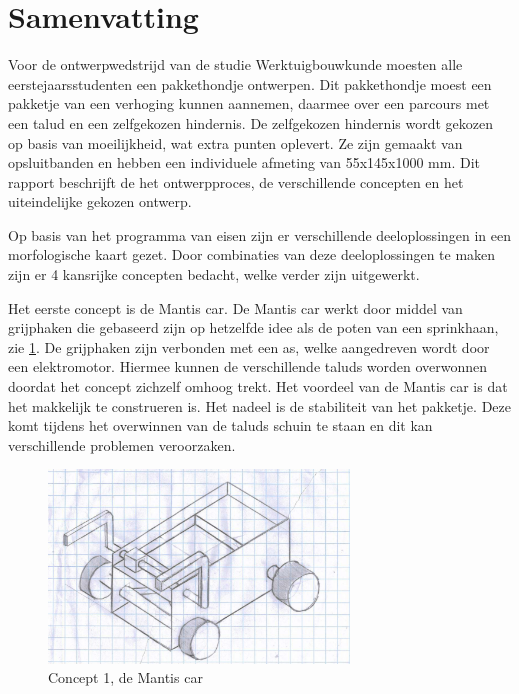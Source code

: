 \chapter*{Samenvatting}
\label{cha:Samenvatting}

Voor de ontwerpwedstrijd van de studie Werktuigbouwkunde moesten alle eerstejaarsstudenten een pakkethondje ontwerpen. Dit pakkethondje moest een pakketje van een verhoging kunnen aannemen, daarmee over een parcours met een talud en een zelfgekozen hindernis. De zelfgekozen hindernis wordt gekozen op basis van moeilijkheid, wat extra punten oplevert. Ze zijn gemaakt van opsluitbanden en hebben een individuele afmeting van 55x145x1000 mm. Dit rapport beschrijft de het ontwerpproces, de verschillende concepten en het uiteindelijke gekozen ontwerp.

Op basis van het programma van eisen zijn er verschillende deeloplossingen in een morfologische kaart gezet. Door combinaties van deze deeloplossingen te maken zijn er 4 kansrijke concepten bedacht, welke verder zijn uitgewerkt.

Het eerste concept is de Mantis car. De Mantis car werkt door middel van grijphaken die gebaseerd zijn op hetzelfde idee als de poten van een sprinkhaan, zie \cref{fig:deeloplossing_mantis2}. De grijphaken zijn verbonden met een as, welke aangedreven wordt door een elektromotor. Hiermee kunnen de verschillende taluds worden overwonnen doordat het concept zichzelf omhoog trekt. Het voordeel van de Mantis car is dat het makkelijk te construeren is. Het nadeel is de stabiliteit van het pakketje. Deze komt tijdens het overwinnen van de taluds schuin te staan en dit kan verschillende problemen veroorzaken.

\begin{figure}[h]
    \centering
    \includegraphics[width = 80mm]{04_idee_ontwikkeling/deeloplossing_mantis.JPG}
    \caption{Concept 1, de Mantis car}
    \label{fig:deeloplossing_mantis2}
\end{figure}

